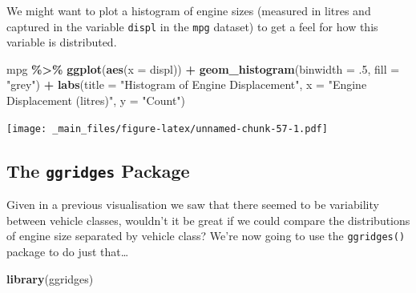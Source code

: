 \documentclass[
]{book}
\newenvironment{Shaded}{\begin{snugshade}}{\end{snugshade}}
\newcommand{\AttributeTok}[1]{\textcolor[rgb]{0.13,0.29,0.53}{#1}}
\newcommand{\DecValTok}[1]{\textcolor[rgb]{0.00,0.00,0.81}{#1}}
\newcommand{\FunctionTok}[1]{\textcolor[rgb]{0.13,0.29,0.53}{\textbf{#1}}}
\newcommand{\NormalTok}[1]{#1}
\newcommand{\SpecialCharTok}[1]{\textcolor[rgb]{0.81,0.36,0.00}{\textbf{#1}}}
\newcommand{\StringTok}[1]{\textcolor[rgb]{0.31,0.60,0.02}{#1}}
\begin{document}
We might want to plot a histogram of engine sizes (measured in litres and captured in the variable \texttt{displ} in the \texttt{mpg} dataset) to get a feel for how this variable is distributed.

\begin{Shaded}
\begin{Highlighting}[]
\NormalTok{mpg }\SpecialCharTok{\%\textgreater{}\%}
  \FunctionTok{ggplot}\NormalTok{(}\FunctionTok{aes}\NormalTok{(}\AttributeTok{x =}\NormalTok{ displ)) }\SpecialCharTok{+}
  \FunctionTok{geom\_histogram}\NormalTok{(}\AttributeTok{binwidth =}\NormalTok{ .}\DecValTok{5}\NormalTok{, }\AttributeTok{fill =} \StringTok{"grey"}\NormalTok{) }\SpecialCharTok{+}
  \FunctionTok{labs}\NormalTok{(}\AttributeTok{title =} \StringTok{"Histogram of Engine Displacement"}\NormalTok{,}
       \AttributeTok{x =} \StringTok{"Engine Displacement (litres)"}\NormalTok{,}
       \AttributeTok{y =} \StringTok{"Count"}\NormalTok{)}
\end{Highlighting}
\end{Shaded}

\texttt{[image: \_main\_files/figure-latex/unnamed-chunk-57-1.pdf]}

\hypertarget{the-ggridges-package}{%
\subsection{\texorpdfstring{The \texttt{ggridges} Package}{The ggridges Package}}\label{the-ggridges-package}}

Given in a previous visualisation we saw that there seemed to be variability between vehicle classes, wouldn't it be great if we could compare the distributions of engine size separated by vehicle class? We're now going to use the \texttt{ggridges()} package to do just that\ldots{}

\begin{Shaded}
\begin{Highlighting}[]
\FunctionTok{library}\NormalTok{(ggridges)}
\end{Highlighting}
\end{Shaded}
\end{document}

